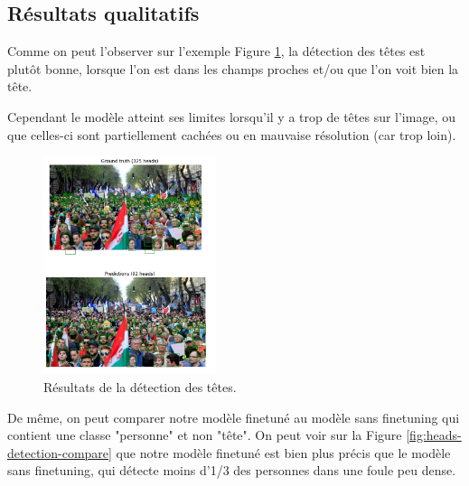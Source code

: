 \subsection{Résultats qualitatifs}

Comme on peut l'observer sur l'exemple Figure \ref{fig:heads-detection}, la détection des têtes est plutôt bonne, lorsque l'on est dans les champs proches et/ou que l'on voit bien la tête.

Cependant le modèle atteint ses limites lorsqu'il y a trop de têtes sur l'image, ou que celles-ci sont partiellement cachées ou en mauvaise résolution (car trop loin).

\begin{figure}[h!]
    \centering
    \includegraphics[width=0.45\textwidth]{images/heads_detection.png}
    \caption{Résultats de la détection des têtes.}
    \label{fig:heads-detection}
\end{figure}

De même, on peut comparer notre modèle finetuné au modèle sans finetuning qui contient une classe "personne" et non "tête". On peut voir sur la Figure \ref{fig:heads-detection-compare} que notre modèle finetuné est bien plus précis que le modèle sans finetuning, qui détecte moins d'1/3 des personnes dans une foule peu dense.

